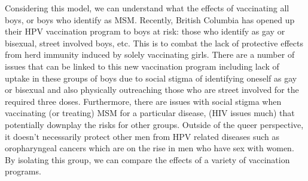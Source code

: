 \documentclass[12pt]{article}
\begin{document}
Considering this model, we can understand what the effects of vaccinating all boys, or boys who identify as MSM.  Recently, British Columbia has opened up their HPV vaccination program to boys at risk: those who identify as gay or bisexual, street involved boys, etc. This is to combat the lack of protective effects from herd immunity induced by solely vaccinating girls.  There are a number of issues that can be linked to this new vaccination program including lack of uptake in these groups of boys due to social stigma of identifying oneself as gay or bisexual and also physically outreaching those who are street involved for the required three doses. Furthermore, there are issues with social stigma when vaccinating (or treating) MSM for a particular disease, (HIV issues much) that potentially downplay the risks for other groups.  Outside of the queer perspective, it doesn't necessarily protect other men from HPV related diseases such as oropharyngeal cancers which are on the rise in men who have sex with women.  By isolating this group, we can compare the effects of a variety of vaccination programs. 
\newpage


\end{document}
